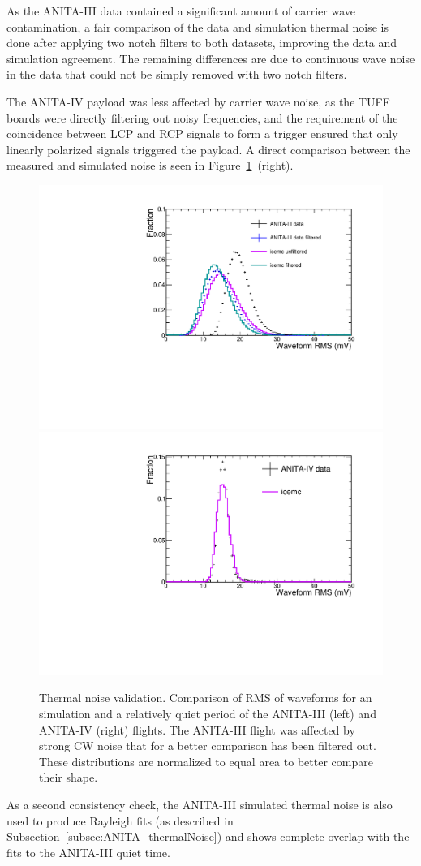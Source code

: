 As the ANITA-III data contained a significant amount of carrier wave
contamination, a fair comparison of the data and simulation thermal noise is done after applying two notch filters to both datasets, improving the data and simulation agreement.
The remaining differences are due to continuous wave noise in the data that
could not be simply removed with two notch filters.

The ANITA-IV payload was less affected by carrier wave noise, as the TUFF boards were directly filtering out noisy frequencies, and the requirement of the coincidence between LCP and RCP signals to form a trigger ensured that only linearly polarized signals triggered the payload.
A direct comparison between the measured and simulated noise is seen in Figure~\ref{fig:RMSwaveform}~(right). 

\begin{figure}[!h]\centering
  \includegraphics[width=.45\linewidth]{./Figs/ValidationThermalNoiseA3_RMSwaveform.pdf}
  \includegraphics[width=.45\linewidth]{./Figs/ValidationThermalNoiseA4_RMSwaveform.pdf}

\caption{Thermal noise validation. Comparison of RMS of waveforms for an \icemc simulation and a relatively quiet period of the ANITA-III (left) and ANITA-IV (right) flights.
    The ANITA-III flight was affected by strong CW noise that for a better comparison has been filtered out.
    These distributions are normalized to equal area to better compare their shape.
  }
  \label{fig:RMSwaveform}
\end{figure}

As a second consistency check, the ANITA-III simulated thermal
noise is also used to produce Rayleigh fits (as described in
Subsection~\ref{subsec:ANITA_thermalNoise}) and shows complete overlap with the fits to the
ANITA-III quiet time.


